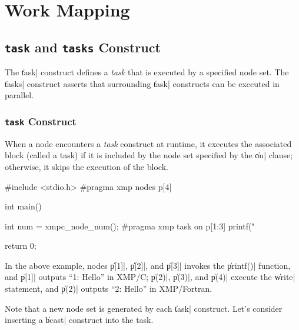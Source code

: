 \section{Work Mapping}

\subsection{{\tt task} and {\tt tasks} Construct}

The \|task| construct defines a {\it task} that is executed by a specified
node set. The \|tasks| construct asserts that surrounding \|task|
constructs can be executed in parallel.


\subsubsection{{\tt task} Construct}

When a node encounters a {\it task} construct at runtime, it executes
the associated block (called a task) if it is included by the node set
specified by the \|on| clause; otherwise, it skips the execution of the
block.


\begin{XCexample}
#include <stdio.h>
#pragma xmp nodes p[4]

int main(){
  int num = xmpc_node_num();
#pragma xmp task on p[1:3]
{
  printf("%
}

  return 0;
}
\end{XCexample}


In the above example, nodes \|p[1]|, \|p[2]|, and \|p[3]| invokes the \|printf()|
function, and \|p[1]| outputs ``1: Hello'' in XMP/C; \|p(2)|, \|p(3)|, and \|p(4)|
execute the \|write| statement, and \|p(2)| outputs ``2: Hello'' in
XMP/Fortran.

Note that a new node set is generated by each \|task| construct. Let's
consider inserting a \|bcast| construct into the task.

